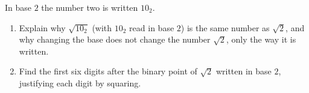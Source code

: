 In base $2$ the number two is written $10_2$.
\begin{enumerate}
\item[(a)] Explain why $\sqrt{10_2}$ (with $10_2$ read in base $2$) is the same number as $\sqrt2$, and why changing the base does not change the number $\sqrt2$, only the way it is written.
\item[(b)] Find the first six digits after the binary point of $\sqrt2$ written in base $2$, justifying each digit by squaring.
\end{enumerate}
